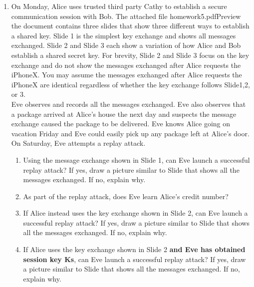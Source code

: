 \documentclass[12pt]{article}
\begin{document}
\renewcommand{\headrulewidth}{0.4pt}
\vspace{-3mm}
\begin{enumerate}
\item On Monday, Alice uses trusted third party Cathy to establish a secure communication session with Bob. The attached file homework5.pdfPreview the document contains three slides that show three different ways to establish a shared key. Slide 1 is the simplest key exchange and shows all messages exchanged.  Slide 2 and Slide 3 each show a variation of how Alice and Bob establish a shared secret key.  For brevity, Slide 2 and Slide 3 focus on the key exchange and do not show the messages exchanged after Alice requests the iPhoneX.  You may assume the messages exchanged after Alice requests the iPhoneX are identical regardless of whether the key exchange follows Slide1,2, or 3. \\

Eve observes and records all the messages exchanged.  Eve also observes that a package arrived at Alice's house the next day and suspects the message exchange caused the package to be delivered.  Eve knows Alice going on vacation Friday and Eve could easily pick up any package left at Alice's door.  On Saturday, Eve attempts a replay attack.
\begin{enumerate}
  \item Using the message exchange shown in Slide 1, can Eve launch a successful replay attack? If yes, draw a picture similar to Slide that shows all the messages exchanged. If no, explain why. \\

  \item As part of the replay attack, does Eve learn Alice's credit number? \\

  \item If Alice instead uses the key exchange shown in Slide 2, can Eve launch a successful replay attack? If yes, draw a picture similar to Slide that shows all the messages exchanged. If no, explain why. \\

  \item If Alice uses the key exchange shown in Slide 2 \textbf{and Eve has obtained session key Ks}, can Eve launch a successful replay attack? If yes, draw a picture similar to Slide that shows all the messages exchanged. If no, explain why.  \\


\end{enumerate}
\end{enumerate}
\end{document}
